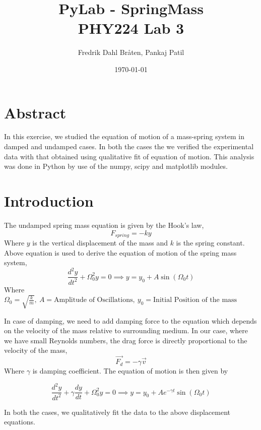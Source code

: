 \documentclass[letterpaper,12pt]{article}
\begin{document}
\title{%
PyLab - SpringMass \\
\large PHY224 Lab 3}
\author{Fredrik Dahl Bråten, Pankaj Patil}
\date{\today}
\maketitle

\section{Abstract}

In this exercise, we studied the equation of motion of a mass-spring system in damped and undamped 
cases. In both the cases the we verified the experimental data with that obtained using qualitative 
fit of equation of motion. This analysis was done in Python by use of the numpy, scipy and matplotlib modules.

\section{Introduction}

The undamped spring mass equation is given by the Hook's law, 
$$F_{spring} = -ky$$
Where $y$ is the vertical displacement of the mass and $k$ is the spring constant.
Above equation is used to derive the equation of motion of  the spring mass system,
\begin{equation}
  \frac{d^2y}{dt^2} + \Omega_{0}^2y = 0 \implies y = y_0 + A\sin(\Omega_0 t)
\end{equation}
Where $\Omega_0 = \sqrt{\frac{k}{m}},\ A = \text{Amplitude of Oscillations},\ y_0 = \text{Initial Position of the mass}$

In case of damping, we need to add damping force to the equation which depends on the velocity of the mass relative
to surrounding medium. In our case, where we have small Reynolds numbers, the drag force is directly proportional
to the velocity of the mass,
$$\vec{F_d} = -\gamma \vec{v} $$
Where $\gamma$ is damping coefficient. The equation of motion is then given by

\begin{equation}
  \frac{d^2y}{dt^2} + \gamma\frac{dy}{dt} + \Omega_{0}^2y = 0 \implies y = y_0 + A e^{-\gamma t}\sin(\Omega_0 t) 
\end{equation}

In both the cases, we qualitatively fit the data to the above displacement equations.
\end{document}
